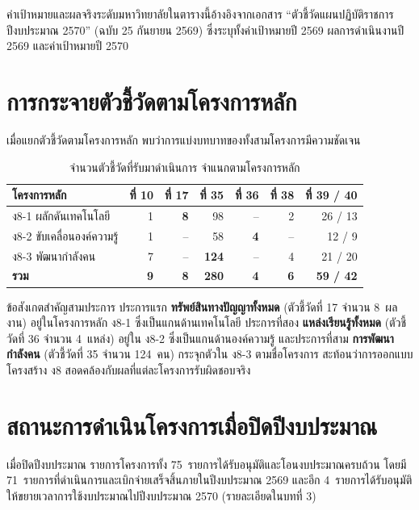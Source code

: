 \begin{infobox}
ค่าเป้าหมายและผลจริงระดับมหาวิทยาลัยในตารางนี้อ้างอิงจากเอกสาร
``ตัวชี้วัดแผนปฏิบัติราชการ ปีงบประมาณ 2570'' (ฉบับ 25 กันยายน 2569)
ซึ่งระบุทั้งค่าเป้าหมายปี 2569 ผลการดำเนินงานปี 2569 และค่าเป้าหมายปี 2570
\end{infobox}

\section{การกระจายตัวชี้วัดตามโครงการหลัก}
เมื่อแยกตัวชี้วัดตามโครงการหลัก พบว่าการแบ่งบทบาทของทั้งสามโครงการมีความชัดเจน

\begin{table}[H]
\centering
\caption{จำนวนตัวชี้วัดที่รับมาดำเนินการ จำแนกตามโครงการหลัก}
\small
\begin{tabular}{L{3.4cm}rrrrrr}
\toprule
{}
\textbf{โครงการหลัก} & \textbf{ที่ 10} & \textbf{ที่ 17} & \textbf{ที่ 35} & \textbf{ที่ 36} & \textbf{ที่ 38} & \textbf{ที่ 39 / 40}\\
\midrule
ง8-1 ผลักดันเทคโนโลยี & 1 & \textbf{8} & 98 & -- & 2 & 26 / 13\\
ง8-2 ขับเคลื่อนองค์ความรู้ & 1 & -- & 58 & \textbf{4} & -- & 12 / 9\\
ง8-3 พัฒนากำลังคน & 7 & -- & \textbf{124} & -- & 4 & 21 / 20\\
\midrule
{}
\textbf{รวม} & \textbf{9} & \textbf{8} & \textbf{280} & \textbf{4} & \textbf{6} & \textbf{59 / 42}\\
\bottomrule
\end{tabular}
\end{table}

ข้อสังเกตสำคัญสามประการ ประการแรก \textbf{ทรัพย์สินทางปัญญาทั้งหมด} (ตัวชี้วัดที่ 17 จำนวน 8~ผลงาน)
อยู่ในโครงการหลัก ง8-1 ซึ่งเป็นแกนด้านเทคโนโลยี ประการที่สอง \textbf{แหล่งเรียนรู้ทั้งหมด}
(ตัวชี้วัดที่ 36 จำนวน 4~แหล่ง) อยู่ใน ง8-2 ซึ่งเป็นแกนด้านองค์ความรู้ และประการที่สาม
\textbf{การพัฒนากำลังคน} (ตัวชี้วัดที่ 35 จำนวน 124~คน) กระจุกตัวใน ง8-3 ตามชื่อโครงการ
สะท้อนว่าการออกแบบโครงสร้าง ง8 สอดคล้องกับผลที่แต่ละโครงการรับผิดชอบจริง

\section{สถานะการดำเนินโครงการเมื่อปิดปีงบประมาณ}
เมื่อปิดปีงบประมาณ รายการโครงการทั้ง 75~รายการได้รับอนุมัติและโอนงบประมาณครบถ้วน
โดยมี 71~รายการที่ดำเนินการและเบิกจ่ายเสร็จสิ้นภายในปีงบประมาณ 2569
และอีก 4~รายการได้รับอนุมัติให้ขยายเวลาการใช้งบประมาณไปปีงบประมาณ 2570 (รายละเอียดในบทที่ 3)

